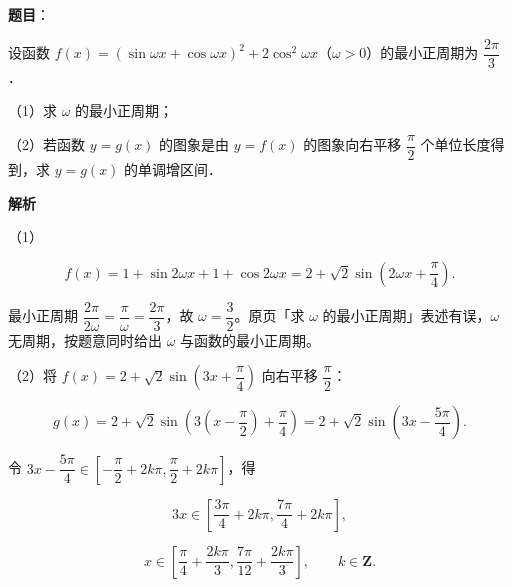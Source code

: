 \begin{answer}

\textbf{题目}：

设函数 $f(x)=(\sin\omega x+\cos\omega x)^2+2\cos^2\omega x$（$\omega>0$）的最小正周期为 $\dfrac{2\pi}3$．

（1）求 $\omega$ 的最小正周期；

（2）若函数 $y=g(x)$ 的图象是由 $y=f(x)$ 的图象向右平移 $\dfrac\pi2$ 个单位长度得到，求 $y=g(x)$ 的单调增区间．

\textbf{解析}

（1）

\nopagebreak[4]
\[f(x)=1+\sin2\omega x+1+\cos2\omega x=2+\sqrt2\sin\left(2\omega x+\frac\pi4\right).\]

最小正周期 $\dfrac{2\pi}{2\omega}=\dfrac\pi\omega=\dfrac{2\pi}3$，故 $\omega=\dfrac32$。原页「求 $\omega$ 的最小正周期」表述有误，$\omega$ 无周期，按题意同时给出 $\omega$ 与函数的最小正周期。

（2）将 $f(x)=2+\sqrt2\sin\left(3x+\dfrac\pi4\right)$ 向右平移 $\dfrac\pi2$：

\nopagebreak[4]
\[g(x)=2+\sqrt2\sin\left(3\left(x-\frac\pi2\right)+\frac\pi4\right)
=2+\sqrt2\sin\left(3x-\frac{5\pi}4\right).\]

令 $3x-\dfrac{5\pi}4\in\left[-\dfrac\pi2+2k\pi,\dfrac\pi2+2k\pi\right]$，得

\nopagebreak[4]
\[3x\in\left[\frac{3\pi}4+2k\pi,\frac{7\pi}4+2k\pi\right],\]

\nopagebreak[4]
\[x\in\left[\frac\pi4+\frac{2k\pi}3,\frac{7\pi}{12}+\frac{2k\pi}3\right],\qquad k\in\mathbf Z.\]


\end{answer}
